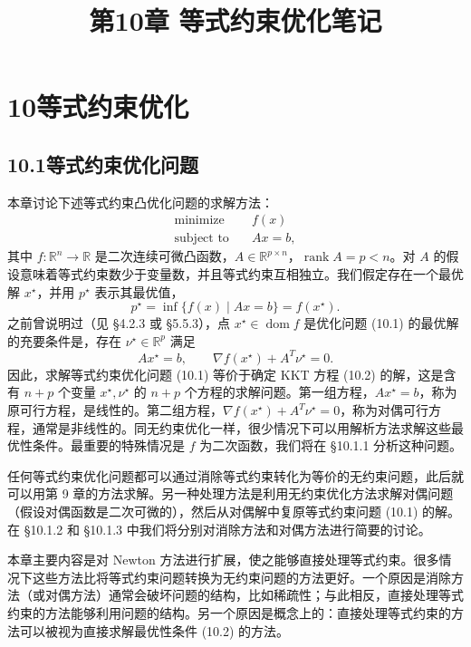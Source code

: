 \documentclass[UTF8,12pt,a4paper,fontset=fandol]{ctexart}
\title{第10章 等式约束优化笔记}
\author{}
\date{}
\begin{document}
\maketitle

\section*{10\quad 等式约束优化}

\subsection*{10.1\quad 等式约束优化问题}

本章讨论下述等式约束凸优化问题的求解方法：
\begin{equation}
\begin{aligned}
\text{minimize}\quad & f(x)\\
\text{subject to}\quad & Ax=b,
\end{aligned}
\tag{10.1}
\end{equation}
其中 $f:\mathbb{R}^n\to\mathbb{R}$ 是二次连续可微凸函数，$A\in\mathbb{R}^{p\times n}$，$\operatorname{rank}A=p<n$。对 $A$ 的假设意味着等式约束数少于变量数，并且等式约束互相独立。我们假定存在一个最优解 $x^\star$，并用 $p^\star$ 表示其最优值，
\[
p^\star=\inf\{f(x)\mid Ax=b\}=f(x^\star).
\]
之前曾说明过（见 \S4.2.3 或 \S5.5.3），点 $x^\star\in\operatorname{dom} f$ 是优化问题 (10.1) 的最优解的充要条件是，存在 $\nu^\star\in\mathbb{R}^p$ 满足
\begin{equation}
Ax^\star=b,\qquad \nabla f(x^\star)+A^T\nu^\star=0.
\tag{10.2}
\end{equation}
因此，求解等式约束优化问题 (10.1) 等价于确定 KKT 方程 (10.2) 的解，这是含有 $n+p$ 个变量 $x^\star,\nu^\star$ 的 $n+p$ 个方程的求解问题。第一组方程，$Ax^\star=b$，称为原可行方程，是线性的。第二组方程，$\nabla f(x^\star)+A^T\nu^\star=0$，称为对偶可行方程，通常是非线性的。同无约束优化一样，很少情况下可以用解析方法求解这些最优性条件。最重要的特殊情况是 $f$ 为二次函数，我们将在 \S10.1.1 分析这种问题。

任何等式约束优化问题都可以通过消除等式约束转化为等价的无约束问题，此后就可以用第 9 章的方法求解。另一种处理方法是利用无约束优化方法求解对偶问题（假设对偶函数是二次可微的），然后从对偶解中复原等式约束问题 (10.1) 的解。在 \S10.1.2 和 \S10.1.3 中我们将分别对消除方法和对偶方法进行简要的讨论。

本章主要内容是对 Newton 方法进行扩展，使之能够直接处理等式约束。很多情况下这些方法比将等式约束问题转换为无约束问题的方法更好。一个原因是消除方法（或对偶方法）通常会破坏问题的结构，比如稀疏性；与此相反，直接处理等式约束的方法能够利用问题的结构。另一个原因是概念上的：直接处理等式约束的方法可以被视为直接求解最优性条件 (10.2) 的方法。
\end{document}
